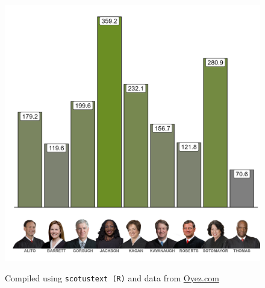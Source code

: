 \begin{landscape}
\begin{figure}[!htb]
\begin{minipage}{0.6\textwidth}
    \includegraphics[width=1.1\textwidth]{../oral_arguments/analyses/Combined/justice_time_combined.png}

    \small{Compiled using \texttt{scotustext (R)} and data from \textcolor{blue}{\href{https://www.oyez.org/}{Oyez.com}}}
\end{minipage}
\end{figure}

\end{landscape}  %
